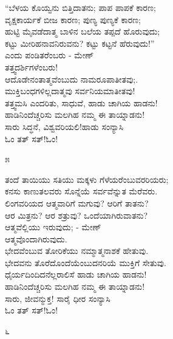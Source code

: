 \begin{myquote}
“ಬೆಳಯ ಕೊಯ್ವನು ಬಿತ್ತಿದಾತನು; ಪಾಪ ಪಾಪಕೆ ಕಾರಣ;\\ವೃಕ್ಷಕಾರ್ಯಕೆ ಬೀಜ ಕಾರಣ; ಪುಣ್ಯ ಪುಣ್ಯಕೆ ಕಾರಣ;\\ಹುಟ್ಟಿ ಮೈವಡೆದಾತ್ಮ ಬಾಳಿನ ಬಲೆಯ ತಪ್ಪದೆ ಹೊರುವುದು;\\ಕಟ್ಟು ಮೀರಿಹನಾವನಿರುವನು? ಕಟ್ಟು ಕಟ್ಟನೆ ಹೆರುವುದು!''\\ಎಂದು ಪಂಡಿತರೆಂಬರು - ಮೇಣ್\\ತತ್ತ್ವದರ್ಶಿಗಳೆಂಬರು!\\ಆದೊಡೇನಂತಾತ್ಮವೆಂಬುದು ನಾಮರೂಪಾತೀತವು;.\\ಮುಕ್ತಿಬಂಧಗಳಿಲ್ಲದಾತ್ಮವು ಸರ್ವನಿಯಮಾತೀತವು!\\ತತ್ತ್ವಮಸಿ ಎಂದರಿತು, ಸಾಧುವೆ, ಹಾಡು ಚಾಗಿಯ ಹಾಡನು!\\ಹಾಡಿನಿಂದೆಚ್ಚರಿಸು ಮಲಗಿಹ ನಮ್ಮ ಈ ತಾಯ್ನಾಡನು!\\ಸಾರು ಸಿದ್ಧನೆ, ವಿಶ್ವವರಿಯಲಿ!ಹಾಡು ಸಂನ್ಯಾಸಿ\\ಓಂ ತತ್ ಸತ್!ಓಂ!
\end{myquote}

\begin{center}
೫
\end{center}

\begin{myquote}
ತಂದೆ ತಾಯಿಯು ಸತಿಯು ಮಕ್ಕಳು ಗೆಳೆಯರೆಂಬುವರರಿಯರು;\\ಕನಸು ಕಾಣುತಲವರು ಸೊನ್ನೆಯೆ ಸರ್ವವೆನ್ನುತ ಮೆರೆವರು.\\ಲಿಂಗವರಿಯದ ಆತ್ಮವಾರಿಗೆ ಮಗುವು? ಆರಿಗೆ ತಾತನು?\\ಆರ ಮಿತ್ರನು? ಆರ ಶತ್ರುವು? ಒಂದೆಯಾಗಿರುವಾತನು?\\ಆತ್ಮವೆಲ್ಲಿಯು ಇರುವುದು; - ಮೇಣ್\\ಆತ್ಮವೊಂದಾಗಿರುವುದು.\\ಭೇದವೆಂಬುವ ತೋರಿಕೆಯು ನಮ್ಮಾತ್ಮನಾಶಕೆ ಹೇತುವು.\\ಭೇದವನು ತೊರೆದೊಂದೆಯೆಂಬುದನರಿಯೆ ಮುಕ್ತಿಗೆ ಸೇತುವು.\\ಧೈರ್ಯದಿಂದಿದನೆಲ್ಲರಾಲಿಸೆ ಹಾಡು ಚಾಗಿಯ ಹಾಡನು!\\ಹಾಡಿನಿಂದೆಚ್ಚರಿಸು ಮಲಗಿಹ ನಮ್ಮ ಈ ತಾಯ್ನಾಡನು!\\ಸಾರು, ಜೀವನ್ಮುಕ್ತ! ಸಾರೈ ಧೀರ ಸಂನ್ಯಾಸಿ\\ಓಂ ತತ್ ಸತ್!ಓಂ!
\end{myquote}

\begin{center}
೬
\end{center}


